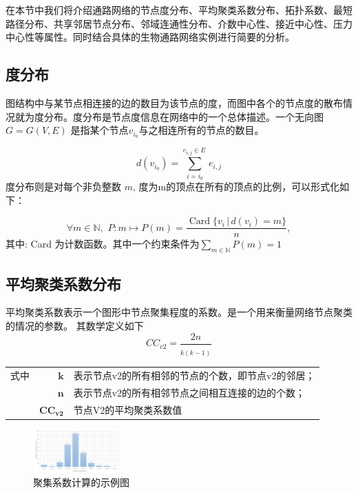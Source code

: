 在本节中我们将介绍通路网络的节点度分布、平均聚类系数分布、拓扑系数、最短路径分布、共享邻居节点分布、邻域连通性分布、介数中心性、接近中心性、压力中心性等属性。同时结合具体的生物通路网络实例进行简要的分析。

\subsection{度分布}
图结构中与某节点相连接的边的数目为该节点的度，而图中各个的节点度的散布情况就为度分布。度分布是节点度信息在网络中的一个总体描述。一个无向图 ${\displaystyle G=G(V,E)}$ 是指某个节点$ {\displaystyle v_{i_{0}}}$与之相连所有的节点的数目。

\begin{equation}\label{eq22}
	d( v_{i_{0}}) =\sum\limits ^{e_{i,j} \in E\ }_{i=i_{0}} e_{i,j}
\end{equation}
度分布则是对每个非负整数 ${\displaystyle m}$, 度为m的顶点在所有的顶点的比例，可以形式化如下：

\begin{equation}\label{eq23}
{\displaystyle \forall m\in \mathbb {N} ,\,\,P:m\mapsto P(m)={\frac {\operatorname {Card} \{v_{i}\,|\,d(v_{i})=m\}}{n}},}
\end{equation}
其中: Card 为计数函数。其中一个约束条件为$ {\displaystyle \sum _{m\in \mathbb {N} }P(m)=1}$

\subsection{平均聚类系数分布}
平均聚类系数表示一个图形中节点聚集程度的系数。是一个用来衡量网络节点聚类的情况的参数。 其数学定义如下
\begin{equation}\label{eq24}
CC_{v2} =\frac{2n}{_{k( k-1)}}
\end{equation}
\begin{tabularx}{\textwidth}{@{}l@{\quad}r@{———}X@{}}
式中 & $\boldsymbol{k}$ &  表示节点v2的所有相邻的节点的个数，即节点v2的邻居；\\
	& $\boldsymbol{n}$ &   表示节点v2的所有相邻节点之间相互连接的边的个数；\\
	& $\boldsymbol{CC_{v2}}$ &	节点V2的平均聚类系数值 \\
\end{tabularx}\vspace{3.15bp}

\begin{figure}
\centering
\includegraphics[width = 0.3\textwidth]{cc}
\caption[fig24]{聚集系数计算的示例图}
\label{fig24}
\end{figure}

